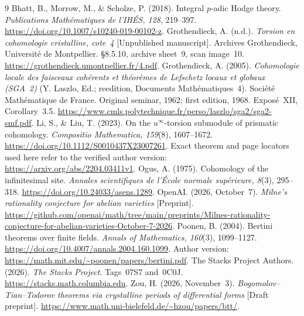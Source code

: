 \documentclass[11pt]{article}
\theoremstyle{definition}\newtheorem{definition}[theorem]{Definition}
\theoremstyle{remark}\newtheorem{remark}[theorem]{Remark}
\begin{document}
\begin{thebibliography}{9}
Bhatt, B., Morrow, M., \& Scholze, P. (2018). Integral $p$-adic Hodge theory. \emph{Publications Math\'ematiques de l'IH\'ES, 128}, 219--397. \url{https://doi.org/10.1007/s10240-019-00102-z}.
Grothendieck, A. (n.d.). \emph{Torsion en cohomologie cristalline, cote~4} [Unpublished manuscript]. Archives Grothendieck, Universit\'e de Montpellier. \S8.5.10, archive sheet~9, scan image~10. \url{https://grothendieck.umontpellier.fr/4.pdf}.
Grothendieck, A. (2005). \emph{Cohomologie locale des faisceaux coh\'erents et th\'eor\`emes de Lefschetz locaux et globaux (SGA~2)} (Y. Laszlo, Ed.; reedition, Documents Math\'ematiques~4). Soci\'et\'e Math\'ematique de France. Original seminar, 1962; first edition, 1968. Expos\'e~XII, Corollary~3.5. \url{https://www.cmls.polytechnique.fr/perso/laszlo/sga2/sga2-smf.pdf}.
Li, S., \& Liu, T. (2023). On the $u^\infty$-torsion submodule of prismatic cohomology. \emph{Compositio Mathematica, 159}(8), 1607--1672. \url{https://doi.org/10.1112/S0010437X23007261}. Exact theorem and page locators used here refer to the verified author version: \url{https://arxiv.org/abs/2204.03411v1}.
Ogus, A. (1975). Cohomology of the infinitesimal site. \emph{Annales scientifiques de l'\'Ecole normale sup\'erieure, 8}(3), 295--318. \url{https://doi.org/10.24033/asens.1289}.
OpenAI. (2026, October~7). \emph{Milne's rationality conjecture for abelian varieties} [Preprint]. \url{https://github.com/openai/math/tree/main/preprints/Milnes-rationality-conjecture-for-abelian-varieties-October-7-2026}.
Poonen, B. (2004). Bertini theorems over finite fields. \emph{Annals of Mathematics, 160}(3), 1099--1127. \url{https://doi.org/10.4007/annals.2004.160.1099}. Author version: \url{https://math.mit.edu/~poonen/papers/bertini.pdf}.
The Stacks Project Authors. (2026). \emph{The Stacks Project}. Tags~07S7 and~0C0J. \url{https://stacks.math.columbia.edu}.
Zou, H. (2026, November~3). \emph{Bogomolov--Tian--Todorov theorems via crystalline periods of differential forms} [Draft preprint]. \url{https://www.math.uni-bielefeld.de/~hzou/papers/btt/}.
\end{thebibliography}
\end{document}
